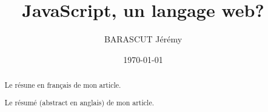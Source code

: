 \documentclass[a4paper,12pt]{report}
\title{JavaScript, un langage web?}
\author{\textsc{BARASCUT} Jérémy}
\date{\today} %
\begin{document}
 
\maketitle

\begin{abstract}
Le résune en français de mon article.
\end{abstract}
 
\begin{abstract}
Le résumé (abstract en anglais) de mon article.
\end{abstract}


 
 
\tableofcontents

% 






































 
 
\printindex
\end{document}
